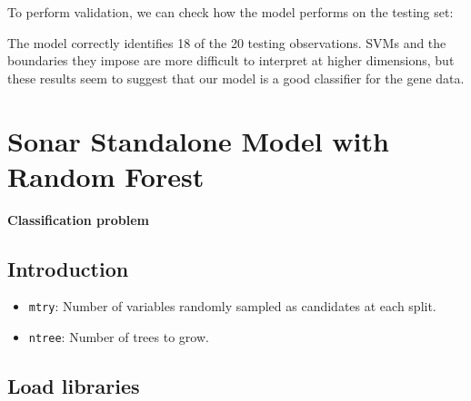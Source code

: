 \documentclass[]{book}
\newenvironment{Shaded}{\begin{snugshade}}{\end{snugshade}}
\newcommand{\CommentTok}[1]{\textcolor[rgb]{0.56,0.35,0.01}{\textit{#1}}}
\newcommand{\DataTypeTok}[1]{\textcolor[rgb]{0.13,0.29,0.53}{#1}}
\newcommand{\KeywordTok}[1]{\textcolor[rgb]{0.13,0.29,0.53}{\textbf{#1}}}
\newcommand{\NormalTok}[1]{#1}
\newcommand{\OperatorTok}[1]{\textcolor[rgb]{0.81,0.36,0.00}{\textbf{#1}}}
\newcommand{\StringTok}[1]{\textcolor[rgb]{0.31,0.60,0.02}{#1}}
\providecommand{\tightlist}{%
  \setlength{\itemsep}{0pt}\setlength{\parskip}{0pt}}
\begin{document}
To perform validation, we can check how the model performs on the testing set:

\begin{Shaded}
\end{Shaded}

The model correctly identifies 18 of the 20 testing observations. SVMs and the boundaries they impose are more difficult to interpret at higher dimensions, but these results seem to suggest that our model is a good classifier for the gene data.

\hypertarget{sonar-standalone-model-with-random-forest}{%
\chapter{Sonar Standalone Model with Random Forest}\label{sonar-standalone-model-with-random-forest}}

\textbf{Classification problem}

\hypertarget{introduction-3}{%
\section{Introduction}\label{introduction-3}}

\begin{itemize}
\tightlist
\item
  \texttt{mtry}: Number of variables randomly sampled as candidates at each split.
\item
  \texttt{ntree}: Number of trees to grow.
\end{itemize}

\hypertarget{load-libraries-1}{%
\section{Load libraries}\label{load-libraries-1}}
\end{document}
